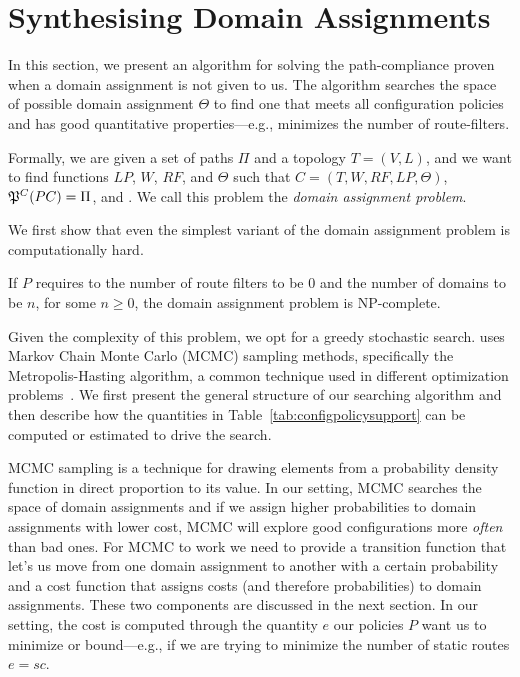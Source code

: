 \section{Synthesising Domain Assignments}
\label{sec:synth-dom-ass}

In this section, we present an algorithm for 
solving the path-compliance proven when a domain assignment is not given to us.
The algorithm searches the space of possible domain assignment $\Theta$ to find
one that meets all configuration policies and has good quantitative properties---e.g., minimizes
the number of route-filters.

Formally, we are given a set of paths $\Pi$ and 
a topology $T=(V,L)$,
and we want to find functions
$LP$, $W$, $RF$,  and $\Theta$ such that
$C=(T,W,RF,LP,\Theta)$,
$\mathfrak{P}^C(PC) = \Pi$, and
.
We call this problem the \emph{domain assignment problem}.


We first show that even the simplest variant of the domain assignment problem
is computationally hard.
\begin{theorem}
If $P$ requires to the number of route filters to be 0
and the number of domains to be $n$, for some $n\geq 0$,
the domain assignment problem is NP-complete.
\end{theorem}

Given the complexity of this problem, we opt for a greedy
stochastic search.
\name uses Markov
Chain Monte Carlo (MCMC) sampling methods, specifically the Metropolis-Hasting
algorithm, a common technique used in different optimization 
problems~\cite{stoke}. 
We first present the general structure of our searching algorithm and 
then describe how the quantities in Table~\ref{tab:configpolicysupport} can be computed
or estimated to drive the search.

MCMC sampling is a technique for 
drawing elements from a
probability density function in direct proportion to its value.
In our setting, MCMC searches the space of domain assignments and
if we assign higher probabilities to domain assignments with lower cost, MCMC will explore
good configurations more \emph{often} than bad ones.
For MCMC to work we need to provide a transition function that let's us move from one domain assignment
to another with a certain probability and a cost function that assigns costs (and therefore probabilities) to
domain assignments. These two components are discussed in the next section.
In our setting, the cost is computed through the quantity $e$ our policies $P$ want us to minimize or bound---e.g.,
if we are trying to minimize the number of static routes $e=sc$.



